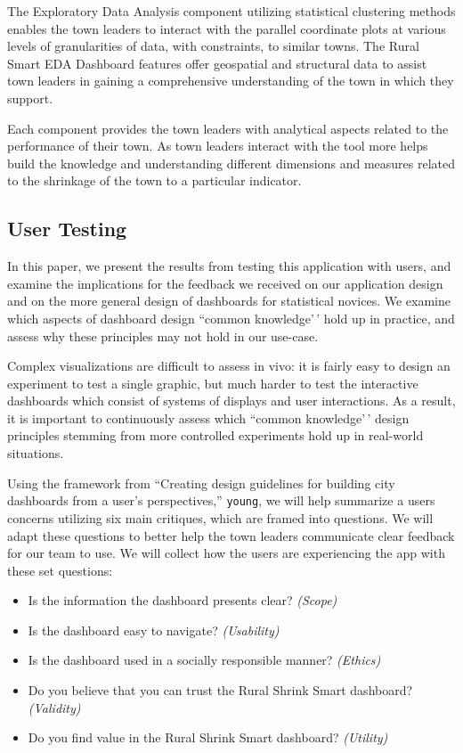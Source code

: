 \documentclass[letterpaper,inpress]{jdsart}
\begin{document}
The Exploratory Data Analysis component utilizing statistical clustering methods enables the town leaders to interact with the parallel coordinate plots at various levels of granularities of data, with constraints, to similar towns. The Rural Smart EDA Dashboard features offer geospatial and structural data to assist town leaders in gaining a comprehensive understanding of the town in which they support.

Each component provides the town leaders with analytical aspects related to the performance of their town. As town leaders interact with the tool more helps build the knowledge and understanding different dimensions and measures related to the shrinkage of the town to a particular indicator.

\subsection{User Testing}

In this paper, we present the results from testing this application with users, and examine the implications for the feedback we received on our application design and on the more general design of dashboards for statistical novices. We examine which aspects of dashboard design ``common knowledge'\,' hold up in practice, and assess why these principles may not hold in our use-case.

Complex visualizations are difficult to assess in vivo: it is fairly easy to design an experiment to test a single graphic, but much harder to test the interactive dashboards which consist of systems of displays and user interactions. As a result, it is important to continuously assess which ``common knowledge'\,' design principles stemming from more controlled experiments hold up in real-world situations.

Using the framework from ``Creating design guidelines for building city dashboards from a user's perspectives,'' \texttt{young}, we will help summarize a users concerns utilizing six main critiques, which are framed into questions. We will adapt these questions to better help the town leaders communicate clear feedback for our team to use. We will collect how the users are experiencing the app with these set questions:

\begin{itemize}
\item Is the information the dashboard presents clear? \textit{(Scope)}
\item Is the dashboard easy to navigate? \textit{(Usability)}
\item Is the dashboard used in a socially responsible manner? \textit{(Ethics)}
\item Do you believe that you can trust the Rural Shrink Smart dashboard? \textit{(Validity)}
\item Do you find value in the Rural Shrink Smart dashboard? \textit{(Utility)}
\end{itemize}
\end{document}
